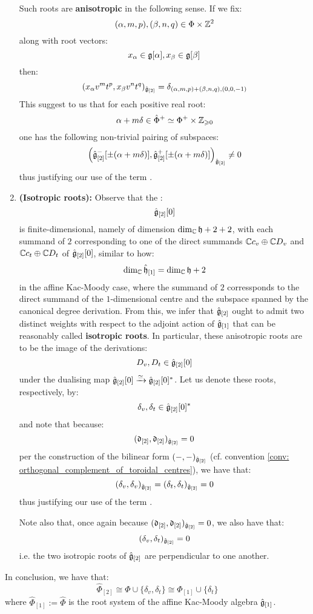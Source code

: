 \begin{remark}
\begin{enumerate}
                Such roots are \textbf{anisotropic} in the following sense. If we fix:
                    $$(\alpha, m, p), (\beta, n, q) \in \Phi \x \Z^2$$
                along with root vectors:
                    $$x_{\alpha} \in \mathfrak{g}[\alpha], x_{\beta} \in \mathfrak{g}[\beta]$$
                then:
                    $$( x_{\alpha} v^m t^p, x_{\beta} v^n t^q )_{\hat{\mathfrak{g}}_{[2]}} = \delta_{(\alpha, m, p) + (\beta, n, q), (0, 0, -1)}$$
                This suggest to us that for each positive real root:
                    $$\alpha + m\delta \in \hat{\Phi}^+ \cong \Phi^+ \x \Z_{\geq 0}$$
                one has the following non-trivial pairing of subspaces:
                    $$\left( \hat{\mathfrak{g}}_{[2]}^-[\pm (\alpha + m\delta)], \hat{\mathfrak{g}}_{[2]}^+[\pm (\alpha + m\delta)] \right)_{\hat{\mathfrak{g}}_{[2]}} \not = 0$$
                thus justifying our use of the term .
                \item \textbf{(Isotropic roots):} Observe that the :
                    $$\hat{\mathfrak{g}}_{[2]}[0]$$
                is finite-dimensional, namely of dimension $\dim_{\mathbb{C}} \mathfrak{h} + 2 + 2$, with each summand of $2$ corresponding to one of the direct summands $\mathbb{C} c_v \oplus \mathbb{C} D_v$ and $\mathbb{C} c_t \oplus \mathbb{C} D_t$ of $\hat{\mathfrak{g}}_{[2]}[0]$, similar to how:
                    $$\dim_{\mathbb{C}} \hat{\mathfrak{h}}_{[1]} = \dim_{\mathbb{C}} \mathfrak{h} + 2$$
                in the affine Kac-Moody case, where the summand of $2$ corressponds to the direct summand of the $1$-dimensional centre and the subspace spanned by the canonical degree derivation. From this, we infer that $\hat{\mathfrak{g}}_{[2]}$ ought to admit two distinct weights with respect to the adjoint action of $\hat{\mathfrak{g}}_{[1]}$ that can be reasonably called \textbf{isotropic roots}. In particular, these anisotropic roots are to be the image of the derivations:
                    $$D_v, D_t \in \hat{\mathfrak{g}}_{[2]}[0]$$
                under the dualising map $\hat{\mathfrak{g}}_{[2]}[0] \xrightarrow[]{\simeq} \hat{\mathfrak{g}}_{[2]}[0]^*$. Let us denote these roots, respectively, by:
                    $$\delta_v, \delta_t \in \hat{\mathfrak{g}}_{[2]}[0]^*$$
                and note that because:
                    $$(\mathfrak{d}_{[2]}, \mathfrak{d}_{[2]})_{\hat{\mathfrak{g}}_{[2]}} = 0$$
                per the construction of the bilinear form $(-, -)_{\hat{\mathfrak{g}}_{[2]}}$ (cf. convention \ref{conv: orthogonal_complement_of_toroidal_centres}), we have that:
                    $$(\delta_v, \delta_v)_{\hat{\mathfrak{g}}_{[2]}} = (\delta_t, \delta_t)_{\hat{\mathfrak{g}}_{[2]}} = 0$$
                thus justifying our use of the term .

                Note also that, once again because $(\mathfrak{d}_{[2]}, \mathfrak{d}_{[2]})_{\hat{\mathfrak{g}}_{[2]}} = 0$, we also have that:
                    $$(\delta_v, \delta_t)_{\hat{\mathfrak{g}}_{[2]}} = 0$$
                i.e. the two isotropic roots of $\hat{\mathfrak{g}}_{[2]}$ are perpendicular to one another. 
            \end{enumerate}

            In conclusion, we have that:
                $$\hat{\Phi}_{[2]} \cong \Phi \cup \{\delta_v, \delta_t\} \cong \hat{\Phi}_{[1]} \cup \{\delta_t\}$$
            where $\hat{\Phi}_{[1]} := \hat{\Phi}$ is the root system of the affine Kac-Moody algebra $\hat{\mathfrak{g}}_{[1]}$.
        \end{remark}
